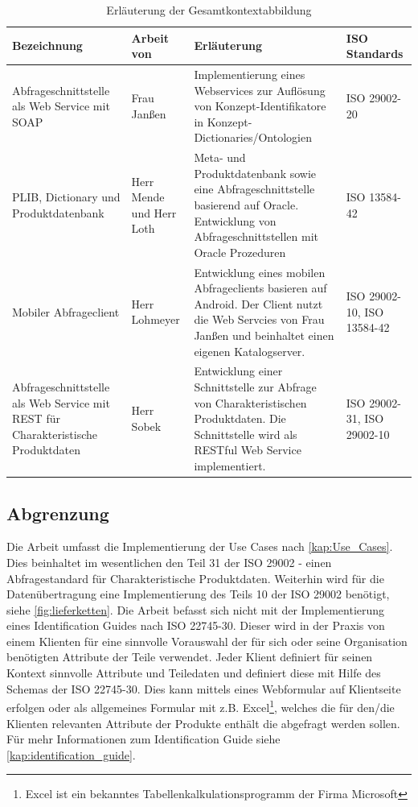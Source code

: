 \begin{table}[!hbt]\vspace{1ex}\centering
\scriptsize
\begin{tabular}{p{3.15cm}p{2.8cm}p{5.5cm}p{3cm}}
\toprule \rowcolor{mylightergray}
\textbf{Bezeichnung} & \textbf{Arbeit von} & \textbf{Erläuterung} &  \textbf{ISO Standards}\\
\midrule
Abfrageschnittstelle als Web Service mit SOAP &  Frau Janßen & Implementierung eines Webservices zur Auflösung von Konzept-Identifikatore in Konzept-Dictionaries/Ontologien & ISO 29002-20 \\
\hline
PLIB, Dictionary und Produktdatenbank &  Herr Mende und Herr Loth & Meta- und Produktdatenbank  sowie eine Abfrageschnittstelle basierend auf Oracle. Entwicklung von Abfrageschnittstellen mit Oracle Prozeduren & ISO 13584-42 \citep[Vergl.][]{iso13584-42}  \\
\hline
Mobiler Abfrageclient & Herr Lohmeyer & Entwicklung eines mobilen Abfrageclients basieren auf Android. Der Client nutzt die Web Servcies von Frau Janßen und beinhaltet einen eigenen Katalogserver. & ISO 29002-10, ISO 13584-42 \\
\hline
Abfrageschnittstelle als Web Service mit REST für Charakteristische Produktdaten & Herr Sobek & Entwicklung einer Schnittstelle zur Abfrage von Charakteristischen Produktdaten. Die Schnittstelle wird als RESTful Web Service implementiert. & ISO 29002-31, ISO 29002-10 \\
\bottomrule
\end{tabular}
\caption{\label{tab.gesamtkontext}Erläuterung der Gesamtkontextabbildung}
\vspace{2ex}\end{table}

\subsection{Abgrenzung}

Die Arbeit umfasst die Implementierung der Use Cases nach \autoref{kap:Use_Cases}. Dies beinhaltet im wesentlichen den Teil 31 der ISO 29002 - einen Abfragestandard für Charakteristische Produktdaten. 
Weiterhin wird für die Datenübertragung eine Implementierung des Teils 10 der ISO 29002 benötigt, siehe \autoref{fig:lieferketten}. 
Die Arbeit befasst sich nicht mit der Implementierung eines Identification Guides nach ISO 22745-30. Dieser wird in der Praxis von einem Klienten für eine sinnvolle Vorauswahl der für sich oder seine Organisation benötigten Attribute der Teile verwendet. Jeder Klient definiert für seinen Kontext sinnvolle Attribute und Teiledaten und definiert diese mit Hilfe des Schemas der ISO 22745-30. Dies kann mittels eines Webformular auf Klientseite erfolgen oder als allgemeines Formular mit z.B. Excel\footnote{Excel ist ein bekanntes Tabellenkalkulationsprogramm der Firma Microsoft}, welches die für den/die Klienten relevanten Attribute der Produkte enthält die abgefragt werden sollen. Für mehr Informationen zum Identification Guide siehe \autoref{kap:identification_guide}.

